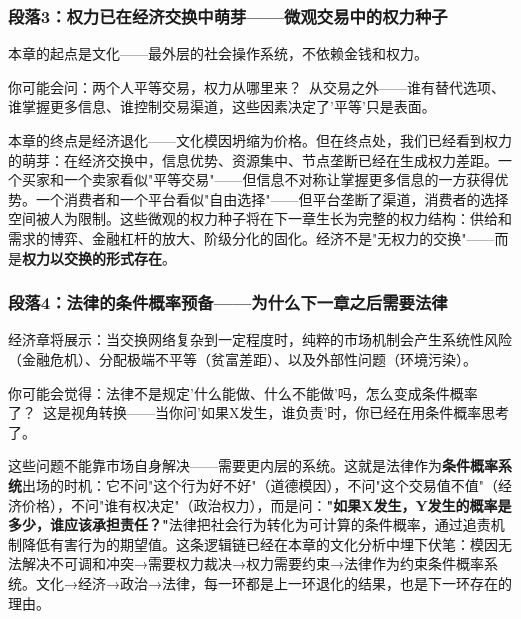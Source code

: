 \documentclass[../main.tex]{subfiles}
\begin{document}
	\subsubsection*{段落3：权力已在经济交换中萌芽——微观交易中的权力种子}

	本章的起点是文化——最外层的社会操作系统，不依赖金钱和权力。

	\begin{tcolorbox}[colback=yellow!5, title=\textit{读者行为预测}]

		你可能会问：两个人平等交易，权力从哪里来？\ 从交易之外——谁有替代选项、谁掌握更多信息、谁控制交易渠道，这些因素决定了'平等'只是表面。

	\end{tcolorbox}

本章的终点是经济退化——文化模因坍缩为价格。但在终点处，我们已经看到权力的萌芽：在经济交换中，信息优势、资源集中、节点垄断已经在生成权力差距。一个买家和一个卖家看似"平等交易"——但信息不对称让掌握更多信息的一方获得优势。一个消费者和一个平台看似"自由选择"——但平台垄断了渠道，消费者的选择空间被人为限制。这些微观的权力种子将在下一章生长为完整的权力结构：供给和需求的博弈、金融杠杆的放大、阶级分化的固化。经济不是"无权力的交换"——而是\textbf{权力以交换的形式存在}。

	\subsubsection*{段落4：法律的条件概率预备——为什么下一章之后需要法律}

	经济章将展示：当交换网络复杂到一定程度时，纯粹的市场机制会产生系统性风险（金融危机）、分配极端不平等（贫富差距）、以及外部性问题（环境污染）。

	\begin{tcolorbox}[colback=yellow!5, title=\textit{读者行为预测}]

		你可能会觉得：法律不是规定'什么能做、什么不能做'吗，怎么变成条件概率了？\ 这是视角转换——当你问'如果X发生，谁负责'时，你已经在用条件概率思考了。

	\end{tcolorbox}

这些问题不能靠市场自身解决——需要更内层的系统。这就是法律作为\textbf{条件概率系统}出场的时机：它不问"这个行为好不好"（道德模因），不问"这个交易值不值"（经济价格），不问"谁有权决定"（政治权力），而是问：\textbf{"如果X发生，Y发生的概率是多少，谁应该承担责任？"}法律把社会行为转化为可计算的条件概率，通过追责机制降低有害行为的期望值。这条逻辑链已经在本章的文化分析中埋下伏笔：模因无法解决不可调和冲突→需要权力裁决→权力需要约束→法律作为约束条件概率系统。文化→经济→政治→法律，每一环都是上一环退化的结果，也是下一环存在的理由。
\end{document}

